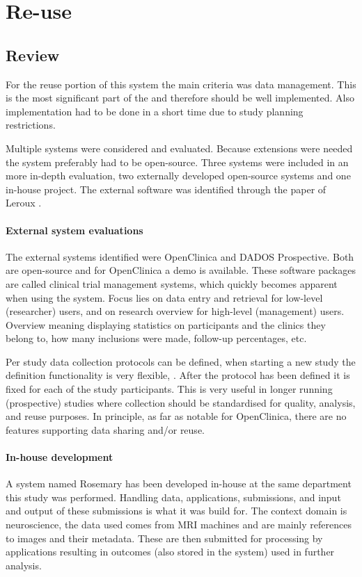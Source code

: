 \section{Re-use}
\label{reuse}

\subsection{Review}
\label{reuse-review}

For the reuse portion of this system the main criteria was data management.
This is the most significant part of the \ivfsystem{} and therefore should be well implemented.
Also implementation had to be done in a short time due to study planning restrictions.

Multiple systems were considered and evaluated.
Because extensions were needed the system preferably had to be open-source.
Three systems were included in an more in-depth evaluation, two externally developed open-source systems and one in-house project.
The external software was identified through the paper of Leroux \cite{leroux2011}.

\paragraph{External system evaluations}
The external systems identified were OpenClinica and DADOS Prospective.
Both are open-source and for OpenClinica a demo is available.
These software packages are called clinical trial management systems, which quickly becomes apparent when using the system.
Focus lies on data entry and retrieval for low-level (researcher) users, and on research overview for high-level (management) users.
Overview meaning displaying statistics on participants and the clinics they belong to, how many inclusions were made, follow-up percentages, etc.

Per study data collection protocols can be defined, when starting a new study the definition functionality is very flexible, .
After the protocol has been defined it is fixed for each of the study participants.
This is very useful in longer running (prospective) studies where collection should be standardised for quality, analysis, and reuse purposes.
In principle, as far as notable for OpenClinica, there are no features supporting data sharing and/or reuse.

\paragraph{In-house development}
A system named Rosemary has been developed in-house at the same department this study was performed.
Handling data, applications, submissions, and input and output of these submissions is what it was build for.
The context domain is neuroscience, the data used comes from MRI machines and are mainly references to images and their metadata.
These are then submitted for processing by applications resulting in outcomes (also stored in the system) used in further analysis.

